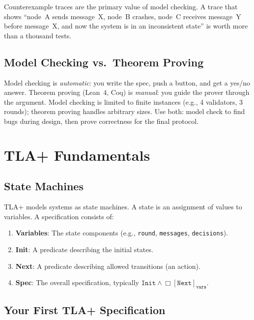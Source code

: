 \documentclass[11pt,a4paper]{article}
\begin{document}
Counterexample traces are the primary value of model checking. A trace that shows
``node~A sends message~X, node~B crashes, node~C receives message~Y before message~X,
and now the system is in an inconsistent state'' is worth more than a thousand tests.

\subsection{Model Checking vs.\ Theorem Proving}

Model checking is \emph{automatic}: you write the spec, push a button, and get a yes/no
answer. Theorem proving (Lean~4, Coq) is \emph{manual}: you guide the prover through
the argument. Model checking is limited to finite instances (e.g., 4 validators, 3 rounds);
theorem proving handles arbitrary sizes. Use both: model check to find bugs during design,
then prove correctness for the final protocol.

\section{TLA+ Fundamentals}

\subsection{State Machines}

TLA+ models systems as state machines. A state is an assignment of values to variables.
A specification consists of:

\begin{enumerate}[nosep]
  \item \textbf{Variables}: The state components (e.g., \texttt{round}, \texttt{messages},
    \texttt{decisions}).
  \item \textbf{Init}: A predicate describing the initial states.
  \item \textbf{Next}: A predicate describing allowed transitions (an action).
  \item \textbf{Spec}: The overall specification, typically $\texttt{Init} \wedge \Box[\texttt{Next}]_{\texttt{vars}}$.
\end{enumerate}

\subsection{Your First TLA+ Specification}
\end{document}
